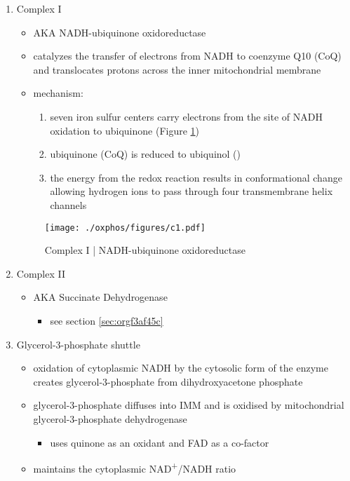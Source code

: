 \documentclass{scrartcl}
\begin{document}
\begin{enumerate}
\item Complex I
\label{sec:orgbf58d9c}
\begin{itemize}
\item AKA NADH-ubiquinone oxidoreductase
\item catalyzes the transfer of electrons from NADH to coenzyme Q10
(CoQ) and translocates protons across the inner mitochondrial
membrane
\end{itemize}

{\small{}}

\begin{itemize}
\item mechanism: 
\begin{enumerate}
\item seven iron sulfur centers carry electrons from the site of NADH
oxidation to ubiquinone (Figure \ref{fig:org63904a8})
\item ubiquinone (CoQ) is reduced to ubiquinol ()
\item the energy from the redox reaction results in conformational
change allowing hydrogen ions to pass through four transmembrane
helix channels
\end{enumerate}
\end{itemize}

\begin{figure}[htbp]
\centering
\texttt{[image: ./oxphos/figures/c1.pdf]}
\caption[c1]{\label{fig:org63904a8}Complex I | NADH-ubiquinone oxidoreductase}
\end{figure}

\item Complex II
\label{sec:orgbf18fa1}
\begin{itemize}
\item AKA Succinate Dehydrogenase 
\begin{itemize}
\item see section \ref{sec:orgf3af45c}
\end{itemize}
\end{itemize}

\item Glycerol-3-phosphate shuttle
\label{sec:org8de32a0}
\begin{itemize}
\item oxidation of cytoplasmic NADH by the cytosolic form of the enzyme
creates glycerol-3-phosphate from dihydroxyacetone phosphate
\item glycerol-3-phosphate diffuses into IMM and is oxidised by mitochondrial glycerol-3-phosphate dehydrogenase
\begin{itemize}
\item uses quinone as an oxidant and FAD as a co-factor
\end{itemize}
\item maintains the cytoplasmic NAD\textsuperscript{+}/NADH ratio
\end{itemize}


\end{enumerate}
\end{document}

